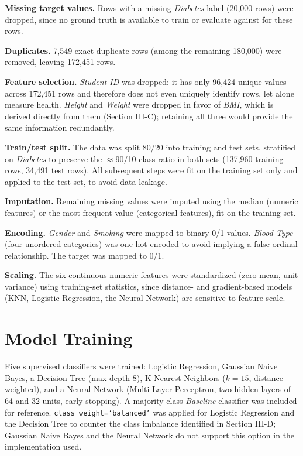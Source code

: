 \documentclass[journal]{IEEEtran}
\begin{document}
\textbf{Missing target values.} Rows with a missing \textit{Diabetes} label (20{,}000 rows) were dropped, since no ground truth is available to train or evaluate against for these rows.

\textbf{Duplicates.} 7{,}549 exact duplicate rows (among the remaining 180{,}000) were removed, leaving 172{,}451 rows.

\textbf{Feature selection.} \textit{Student ID} was dropped: it has only 96{,}424 unique values across 172{,}451 rows and therefore does not even uniquely identify rows, let alone measure health. \textit{Height} and \textit{Weight} were dropped in favor of \textit{BMI}, which is derived directly from them (Section III-C); retaining all three would provide the same information redundantly.

\textbf{Train/test split.} The data was split 80/20 into training and test sets, stratified on \textit{Diabetes} to preserve the $\approx$90/10 class ratio in both sets (137{,}960 training rows, 34{,}491 test rows). All subsequent steps were fit on the training set only and applied to the test set, to avoid data leakage.

\textbf{Imputation.} Remaining missing values were imputed using the median (numeric features) or the most frequent value (categorical features), fit on the training set.

\textbf{Encoding.} \textit{Gender} and \textit{Smoking} were mapped to binary 0/1 values. \textit{Blood Type} (four unordered categories) was one-hot encoded to avoid implying a false ordinal relationship. The target was mapped to 0/1.

\textbf{Scaling.} The six continuous numeric features were standardized (zero mean, unit variance) using training-set statistics, since distance- and gradient-based models (KNN, Logistic Regression, the Neural Network) are sensitive to feature scale.

\section{Model Training}
Five supervised classifiers were trained: Logistic Regression, Gaussian Naive Bayes, a Decision Tree (max depth 8), K-Nearest Neighbors ($k=15$, distance-weighted), and a Neural Network (Multi-Layer Perceptron, two hidden layers of 64 and 32 units, early stopping). A majority-class \textit{Baseline} classifier was included for reference. \texttt{class\_weight=`balanced'} was applied for Logistic Regression and the Decision Tree to counter the class imbalance identified in Section III-D; Gaussian Naive Bayes and the Neural Network do not support this option in the implementation used.
\end{document}
